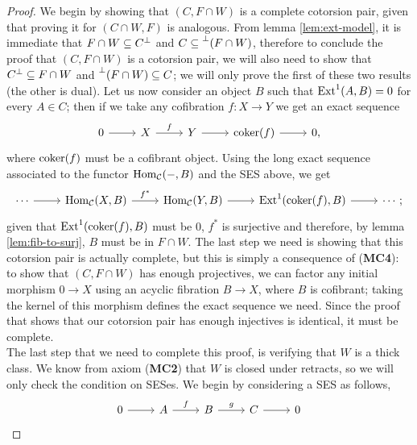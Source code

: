 \begin{proof}
	We begin by showing that $(C, F\cap W)$ is a complete cotorsion pair, given that proving it for $(C\cap W, F)$ is analogous. From lemma \ref{lem:ext-model}, it is immediate that $F\cap W \subseteq {C}^\perp$ and $C \subseteq \prescript{\perp}{}{(F\cap W)}$, therefore to conclude the proof that $(C, F\cap W)$ is a cotorsion pair, we will also need to show that ${C}^\perp \subseteq  F\cap W$ and $\prescript{\perp}{}{(F\cap W)} \subseteq C$; we will only prove the first of these two results (the other is dual). Let us now consider an object $B$ such that  $\mathrm{Ext}^1(A,B) = 0$ for every $A\in C$; then if we take any cofibration $f\colon X \longrightarrow Y$ we get an exact sequence
	\[\begin{tikzcd}
		0 & X & Y & {\coker(f)} & {0,}
		\arrow[from=1-1, to=1-2]
		\arrow["f", from=1-2, to=1-3]
		\arrow[from=1-3, to=1-4]
		\arrow[from=1-4, to=1-5]
	\end{tikzcd}\]
	where $\operatorname{coker}(f)$ must be a cofibrant object. Using the long exact sequence associated to the functor $\mathrm{Hom}_{\mathcal{C}}({-},B)$ and the SES above, we get
	\[\begin{tikzcd}
		\cdots & {\Hom_\C(X,B)} & {\Hom_\C(Y,B)} & {\Ext^1(\coker(f),B)} & {\cdots;}
		\arrow[from=1-1, to=1-2]
		\arrow["{f^*}", from=1-2, to=1-3]
		\arrow[from=1-3, to=1-4]
		\arrow[from=1-4, to=1-5]
	\end{tikzcd}\]
	given that $\mathrm{Ext}^1(\operatorname{coker}(f),B)$ must be $0$, $f^*$ is surjective and therefore, by lemma \ref{lem:fib-to-surj}, $B$ must be in $F\cap W$. The last step we need is showing that this cotorsion pair is actually complete, but this is simply a consequence of (\textbf{MC4}): to show that $(C, F\cap W)$ has enough projectives, we can factor any initial morphism $0\longrightarrow X$ using an acyclic fibration $B \longrightarrow X$, where $B$ is cofibrant; taking the kernel of this morphism defines the exact sequence we need. Since the proof that shows that our cotorsion pair has enough injectives is identical, it must be complete.\\
	The last step that we need to complete this proof, is verifying that $W$ is a thick class. We know from axiom (\textbf{MC2}) that $W$ is closed under retracts, so we will only check the condition on SESes. 
	We begin by considering a SES as follows,
	\[\begin{tikzcd}
		0 & A & B & C & 0
		\arrow[from=1-1, to=1-2]
		\arrow["f", from=1-2, to=1-3]
		\arrow["g", from=1-3, to=1-4]
		\arrow[from=1-4, to=1-5]
	\end{tikzcd}\]

\end{proof}
